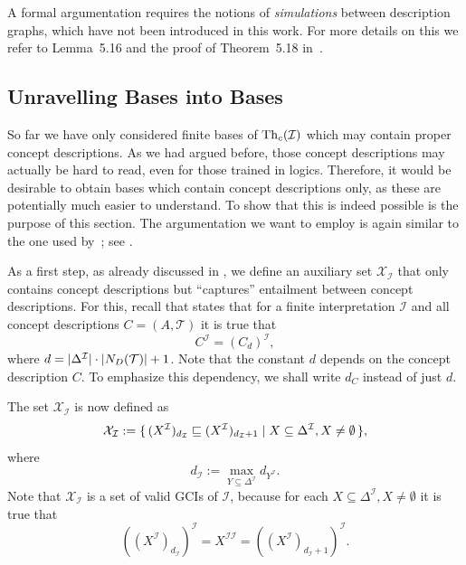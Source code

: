 A formal argumentation requires the notions of \emph{simulations} between \EL description
graphs, which have not been introduced in this work.  For more details on this we refer to
Lemma~5.16 and the proof of Theorem~5.18 in~\cite{Diss-Felix}.

\subsection{Unravelling \ELgfpbot Bases into \ELbot Bases}
\label{sec:unrav-elgfpb-bases}

So far we have only considered finite bases of $\operatorname{Th}_c(\mathcal{I})$ which may contain
proper \ELgfpbot concept descriptions.  As we had argued before, those concept
descriptions may actually be hard to read, even for those trained in logics.  Therefore, it
would be desirable to obtain bases which contain \ELbot concept descriptions only, as
these are potentially much easier to understand.  To show that this is indeed possible is
the purpose of this section.  The argumentation we want to employ is again similar to the
one used by~\cite{Diss-Felix}; see .

As a first step, as already discussed in , we define an auxiliary
set $\mathcal{X}_{\mathcal{I}}$ that only contains \ELbot concept descriptions but
\enquote{captures} entailment between \ELgfpbot concept descriptions.  For this, recall
that  states that for a finite interpretation $\mathcal{I}$ and
all \ELgfpbot concept descriptions $C = (A, \mathcal{T})$ it is true that
\begin{equation*}
  C^{\mathcal{I}} = (C_d)^{\mathcal{I}},
\end{equation*}
where $d = \lvert \Delta^{\mathcal{I}} \rvert \cdot \lvert N_D(\mathcal{T}) \rvert + 1$.  Note that
the constant $d$ depends on the concept description $C$.  To emphasize this dependency, we
shall write $d_{C}$ instead of just $d$.

The set $\mathcal{X}_{\mathcal{I}}$ is now defined as
\begin{equation*}
  \mathcal{X}_{\mathcal{I}} := {\{\, (X^{\mathcal{I}})_{d_{\mathcal{I}}} \sqsubseteq
    (X^{\mathcal{I}})_{d_{\mathcal{I}}+1} \mid X \subseteq \Delta^{\mathcal{I}}, X \neq
    \emptyset \,\}},  
\end{equation*}
where
\begin{equation*}
  d_{\mathcal{I}} := \max_{Y \subseteq \Delta^{\mathcal{I}}} d_{Y^{\mathcal{I}}}.
\end{equation*}
Note that $\mathcal{X}_{\mathcal{I}}$ is a set of valid GCIs of $\mathcal{I}$, because
for each $X \subseteq \Delta^{\mathcal{I}}, X \neq \emptyset$ it is true that
\begin{equation*}
  ((X^{\mathcal{I}})_{d_{\mathcal{I}}})^{\mathcal{I}} = X^{\mathcal{I}\mathcal{I}} =
  ((X^{\mathcal{I}})_{d_{\mathcal{I}}+1})^{\mathcal{I}}.
\end{equation*}

